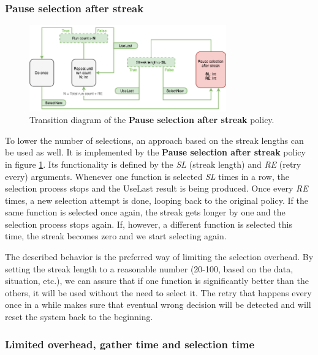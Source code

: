 \subsubsection{Pause selection after streak}

\begin{figure}[h!]
	\captionsetup{justification=centering,margin=0.5cm}
	\centerline{\mbox{\includegraphics[width=85mm]{./img/pause_selection_after_streak.png}}}
	\caption{Transition diagram of the \textbf{Pause selection after streak} policy.}
	\label{fig:pause_selection_after_streak}
\end{figure}

To lower the number of selections, an approach based on the streak lengths can be used as well. It is implemented by the \textbf{Pause selection after streak} policy in figure \ref{fig:pause_selection_after_streak}. Its functionality is defined by the \textit{SL} (streak length) and \textit{RE} (retry every) arguments. Whenever one function is selected \textit{SL} times in a row, the selection process stops and the UseLast result is being produced. Once every \textit{RE} times, a new selection attempt is done, looping back to the original policy. If the same function is selected once again, the streak gets longer by one and the selection process stops again. If, however, a different function is selected this time, the streak becomes zero and we start selecting again.

The described behavior is the preferred way of limiting the selection overhead. By setting the streak length to a reasonable number (20-100, based on the data, situation, etc.), we can assure that if one function is significantly better than the others, it will be used without the need to select it. The retry that happens every once in a while makes sure that eventual wrong decision will be detected and will reset the system back to the beginning.

\subsubsection{Limited overhead, gather time and selection time}

